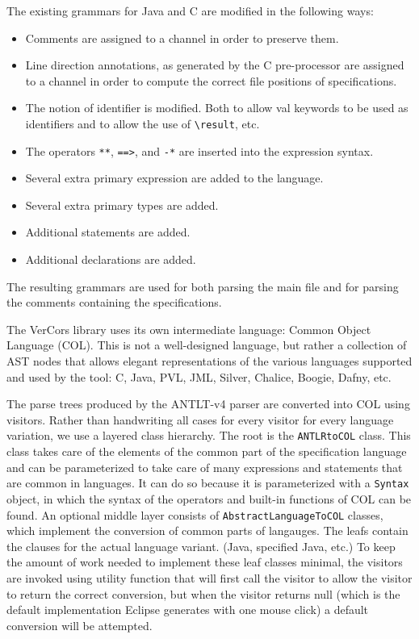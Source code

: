 \documentclass{report}
\begin{document}
The existing grammars for Java and C are modified in the following ways:
\begin{itemize}
\item Comments are assigned to a channel in order to preserve them.
\item Line direction annotations, as generated by the C pre-processor are
assigned to a channel in order to compute the correct file positions of specifications.
\item The notion of identifier is modified. Both to allow val keywords to be used as identifiers
and to allow the use of \verb+\result+, etc.
\item The operators \verb+**+, \verb+==>+, and \verb+-*+ are inserted into the expression
syntax.
\item Several extra primary expression are added to the language.
\item Several extra primary types are added.
\item Additional statements are added.
\item Additional declarations are added.
\end{itemize}
The resulting grammars are used for both parsing the main file and for parsing
the comments containing the specifications.

The VerCors library uses its own intermediate language: Common Object Language (COL).
This is not a well-designed language, but rather a collection of AST nodes
that allows elegant representations of the various languages supported and
used by the tool: C, Java, PVL, JML, Silver, Chalice, Boogie, Dafny, etc.

The parse trees produced by the ANTLT-v4 parser are converted into COL
using visitors. Rather than handwriting all cases for every visitor
for every language variation, we use a layered class hierarchy.
The root is the \lstinline+ANTLRtoCOL+ class. This class takes care
of the elements of the common part of the specification language
and can be parameterized to take care of many expressions and
statements that are common in languages. It can do so because 
it is parameterized with a \lstinline+Syntax+ object, in which the 
syntax of the operators and built-in functions of COL can be found.
An optional middle layer consists of \lstinline+AbstractLanguageToCOL+ classes,
which implement the conversion of common parts of langauges.
The leafs contain the clauses for the actual language variant.
(Java, specified Java, etc.) To keep the amount of work needed to implement
these leaf classes minimal, the visitors are invoked using utility function that
will first call the visitor to allow the visitor to return the correct conversion,
but when the visitor returns null (which is the default implementation Eclipse generates
with one mouse click) a default conversion will be attempted.
\end{document}
